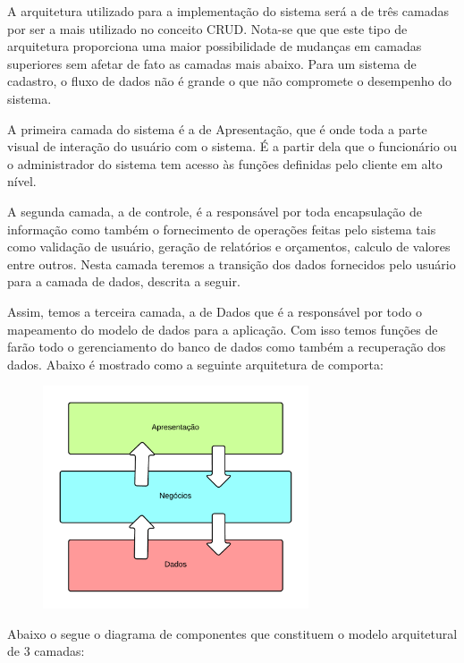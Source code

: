 \documentclass[a4paper,10pt]{article}
\begin{document}
A arquitetura utilizado para a implementação do sistema será a de três camadas por ser a mais utilizado no conceito CRUD. Nota-se que que este tipo de arquitetura proporciona uma maior possibilidade de mudanças em camadas superiores sem afetar de fato as camadas mais abaixo. Para um sistema de cadastro, o fluxo de dados não é grande o que não compromete o desempenho do sistema.

A primeira camada do sistema é a de Apresentação, que é onde toda a parte visual de interação do usuário com o sistema. É a partir dela que o funcionário ou o administrador do sistema tem acesso às funções definidas pelo cliente em alto nível.

A segunda camada, a de controle, é a responsável por toda encapsulação de informação como também o fornecimento de operações feitas pelo sistema tais como validação de usuário, geração de relatórios e orçamentos, calculo de valores entre outros. Nesta camada teremos a transição dos dados fornecidos pelo usuário para a camada de dados, descrita a seguir.

Assim, temos a terceira camada, a de Dados que é a responsável por todo o mapeamento do modelo de dados para a aplicação. Com isso temos funções de farão todo o gerenciamento do banco de dados como também a recuperação dos dados. Abaixo é mostrado como a seguinte arquitetura de comporta:

\begin{figure}[H]
\centering
\includegraphics[width=0.7\textwidth]{pic/mvc_1.png}
\end{figure}

Abaixo o segue o diagrama de componentes que constituem o modelo arquitetural de 3 camadas:
\end{document}
